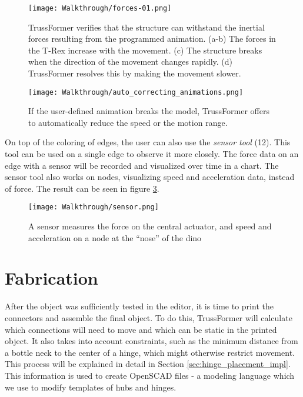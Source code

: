 \begin{figure}[h!]
    \texttt{[image: Walkthrough/forces-01.png]}
    \centering
    \caption{TrussFormer verifies that the structure can withstand the inertial forces resulting from the programmed animation. (a-b) The forces in the T-Rex increase with the movement. (c) The structure breaks when the direction of the movement changes rapidly. (d) TrussFormer resolves this by making the movement slower.}
    \label{fig:fix_breaking}
\end{figure}
\begin{figure}[h!]
    \texttt{[image: Walkthrough/auto\_correcting\_animations.png]}
    \centering
    \caption{If the user-defined animation breaks the model, TrussFormer offers to automatically reduce the speed or the motion range.}
    \label{fig:correcting_animation}
\end{figure}

On top of the coloring of edges, the user can also use the \textit{sensor tool} (12). This tool can be used on a single edge to observe it more closely. The force data on an edge with a sensor will be recorded and visualized over time in a chart. The sensor tool also works on nodes, visualizing speed and acceleration data, instead of force. The result can be seen in figure \ref{fig:sensor}.\\
\begin{figure}[h!]
    \texttt{[image: Walkthrough/sensor.png]}
    \centering
    \caption{A sensor measures the force on the central actuator, and speed and acceleration on a node at the ``nose'' of the dino}
    \label{fig:sensor}
\end{figure}

\section{Fabrication}
After the object was sufficiently tested in the editor, it is time to print the connectors and assemble the final object. To do this, TrussFormer will calculate which connections will need to move and which can be static in the printed object. It also takes into account constraints, such as the minimum distance from a bottle neck to the center of a hinge, which might otherwise restrict movement. This process will be explained in detail in Section \ref{sec:hinge_placement_impl}. This information is used to create OpenSCAD files - a modeling language which we use to modify templates of hubs and hinges.

